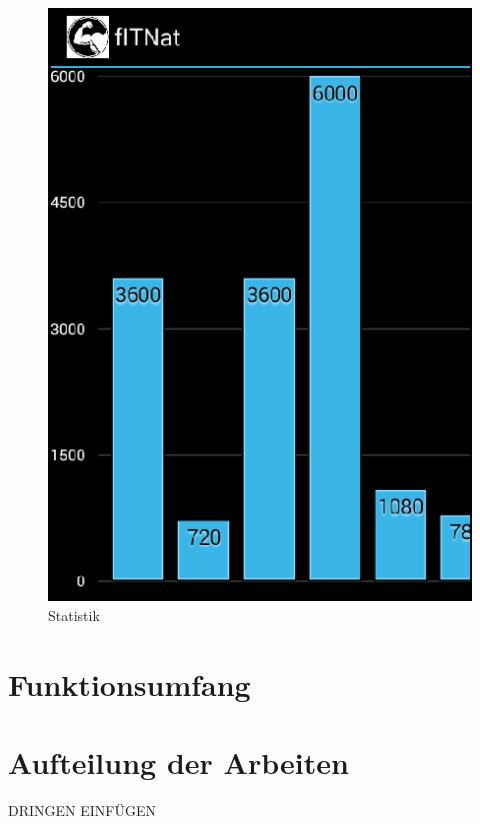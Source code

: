 \begin{figure}[!h]
\centering
\includegraphics[width=0.5\linewidth]{content/images/App/Statistik}
\caption{Statistik}
\label{pic:natAppStatistik}
\end{figure}

\section{Funktionsumfang}
\label{natAppFunktionen}

\section{Aufteilung der Arbeiten}
\label{sec:aufteilung-arbeiten}
DRINGEN EINFÜGEN